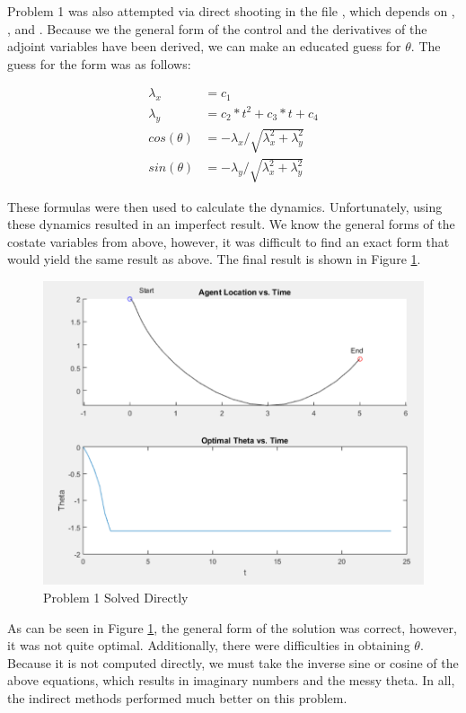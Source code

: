 \documentclass[12pt,letterpaper]{article}
\begin{document}
Problem 1 was also attempted via direct shooting in the file , which depends on , , and . Because we the general form of the control and the derivatives of the adjoint variables have been derived, we can make an educated guess for $\theta$. The guess for the form was as follows:

\begin{equation}
\begin{aligned}
\label{eq:2}
\lambda_x &= c_1 \\
\lambda_y &= c_2*t^2 + c_3*t + c_4  \\
cos(\theta) &= -\lambda_x / \sqrt{\lambda_x^2 + \lambda_y^2} \\
sin(\theta) &= -\lambda_y / \sqrt{\lambda_x^2 + \lambda_y^2}
\end{aligned}
\end{equation}

These formulas were then used to calculate the dynamics. Unfortunately, using these dynamics resulted in an imperfect result. We know the general forms of the costate variables from above, however, it was difficult to find an exact form that would yield the same result as above. The final result is shown in Figure \ref{fig:prob1direct}.

\begin{figure}[!h]
\centering
\includegraphics[width=5in]{prob1direct.png}
\caption{Problem 1 Solved Directly}
\label{fig:prob1direct}
\end{figure}

As can be seen in Figure \ref{fig:prob1direct}, the general form of the solution was correct, however, it was not quite optimal. Additionally, there were difficulties in obtaining $\theta$. Because it is not computed directly, we must take the inverse sine or cosine of the above equations, which results in imaginary numbers and the messy theta. In all, the indirect methods performed much better on this problem.
\end{document}
